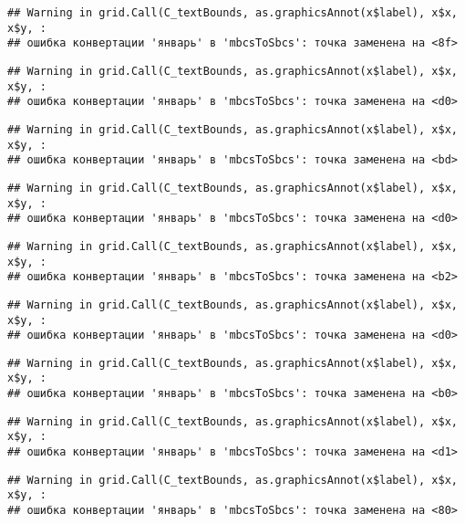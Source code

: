\documentclass[
]{article}
\begin{document}
\begin{verbatim}
## Warning in grid.Call(C_textBounds, as.graphicsAnnot(x$label), x$x, x$y, :
## ошибка конвертации 'январь' в 'mbcsToSbcs': точка заменена на <8f>
\end{verbatim}

\begin{verbatim}
## Warning in grid.Call(C_textBounds, as.graphicsAnnot(x$label), x$x, x$y, :
## ошибка конвертации 'январь' в 'mbcsToSbcs': точка заменена на <d0>
\end{verbatim}

\begin{verbatim}
## Warning in grid.Call(C_textBounds, as.graphicsAnnot(x$label), x$x, x$y, :
## ошибка конвертации 'январь' в 'mbcsToSbcs': точка заменена на <bd>
\end{verbatim}

\begin{verbatim}
## Warning in grid.Call(C_textBounds, as.graphicsAnnot(x$label), x$x, x$y, :
## ошибка конвертации 'январь' в 'mbcsToSbcs': точка заменена на <d0>
\end{verbatim}

\begin{verbatim}
## Warning in grid.Call(C_textBounds, as.graphicsAnnot(x$label), x$x, x$y, :
## ошибка конвертации 'январь' в 'mbcsToSbcs': точка заменена на <b2>
\end{verbatim}

\begin{verbatim}
## Warning in grid.Call(C_textBounds, as.graphicsAnnot(x$label), x$x, x$y, :
## ошибка конвертации 'январь' в 'mbcsToSbcs': точка заменена на <d0>
\end{verbatim}

\begin{verbatim}
## Warning in grid.Call(C_textBounds, as.graphicsAnnot(x$label), x$x, x$y, :
## ошибка конвертации 'январь' в 'mbcsToSbcs': точка заменена на <b0>
\end{verbatim}

\begin{verbatim}
## Warning in grid.Call(C_textBounds, as.graphicsAnnot(x$label), x$x, x$y, :
## ошибка конвертации 'январь' в 'mbcsToSbcs': точка заменена на <d1>
\end{verbatim}

\begin{verbatim}
## Warning in grid.Call(C_textBounds, as.graphicsAnnot(x$label), x$x, x$y, :
## ошибка конвертации 'январь' в 'mbcsToSbcs': точка заменена на <80>
\end{verbatim}
\end{document}
